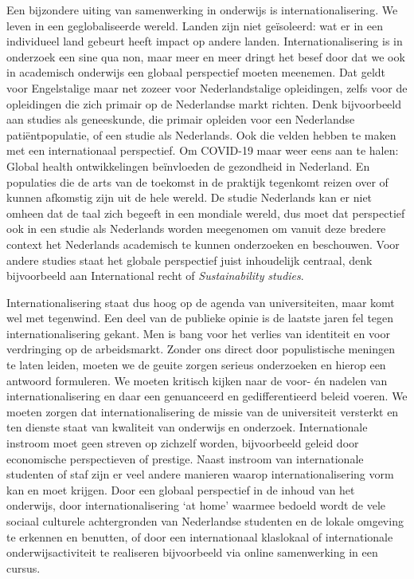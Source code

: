 \documentclass[smallauthor, chapterhaspagenum, nochapterinheader, pagenuminheader,  bigchapnum,medium2, tocpages,  garamond, titleinheader]{jote-book}
\begin{document}
	Een bijzondere uiting van samenwerking in onderwijs is internationalisering. We leven in een geglobaliseerde wereld. Landen zijn niet geïsoleerd: wat er in een individueel land gebeurt heeft impact op andere landen. Internationalisering is in onderzoek een sine qua non, maar meer en meer dringt het besef door dat we ook in academisch onderwijs een globaal perspectief moeten meenemen. Dat geldt voor Engelstalige maar net zozeer voor Nederlandstalige opleidingen, zelfs voor de opleidingen die zich primair op de Nederlandse markt richten. Denk bijvoorbeeld aan studies als geneeskunde, die primair opleiden voor een Nederlandse patiëntpopulatie, of een studie als Nederlands. Ook die velden hebben te maken met een internationaal perspectief. Om COVID-19 maar weer eens aan te halen: Global health ontwikkelingen beïnvloeden de gezondheid in Nederland. En populaties die de arts van de toekomst in de praktijk tegenkomt reizen over of kunnen afkomstig zijn uit de hele wereld. De studie Nederlands kan er niet omheen dat de taal zich begeeft in een mondiale wereld, dus moet dat perspectief ook in een studie als Nederlands worden meegenomen om vanuit deze bredere context het Nederlands academisch te kunnen onderzoeken en beschouwen. Voor andere studies staat het globale perspectief juist inhoudelijk centraal, denk bijvoorbeeld aan International recht of \emph{Sustainability} \emph{studies}.



	Internationalisering staat dus hoog op de agenda van universiteiten, maar komt wel met tegenwind. Een deel van de publieke opinie is de laatste jaren fel tegen internationalisering gekant. Men is bang voor het verlies van identiteit en voor verdringing op de arbeidsmarkt. Zonder ons direct door populistische meningen te laten leiden, moeten we de geuite zorgen serieus onderzoeken en hierop een antwoord formuleren. We moeten kritisch kijken naar de voor- én nadelen van internationalisering en daar een genuanceerd en gedifferentieerd beleid voeren. We moeten zorgen dat internationalisering de missie van de universiteit versterkt en ten dienste staat van kwaliteit van onderwijs en onderzoek. Internationale instroom moet geen streven op zichzelf worden, bijvoorbeeld geleid door economische perspectieven of prestige. Naast instroom van internationale studenten of staf zijn er veel andere manieren waarop internationalisering vorm kan en moet krijgen. Door een globaal perspectief in de inhoud van het onderwijs, door internationalisering ‘at home' waarmee bedoeld wordt de vele sociaal culturele achtergronden van Nederlandse studenten en de lokale omgeving te erkennen en benutten, of door een internationaal klaslokaal of internationale onderwijsactiviteit te realiseren bijvoorbeeld via online samenwerking in een cursus.
\end{document}
